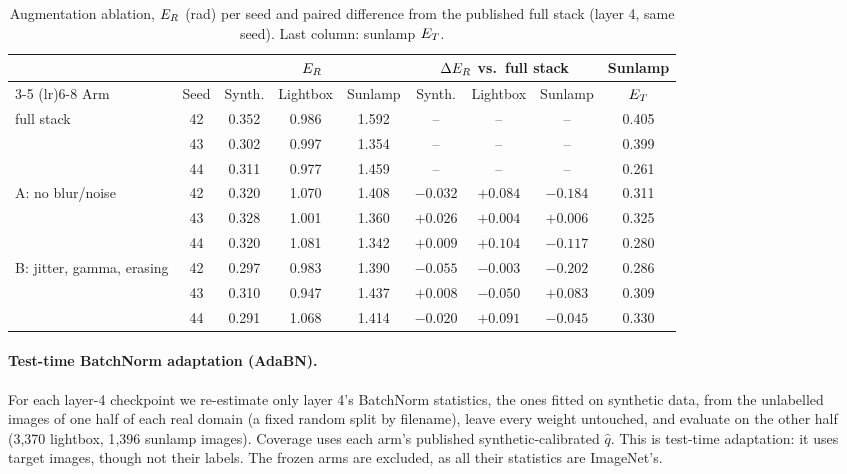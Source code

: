 \begin{table}[ht]
  \setlength{\tabcolsep}{3pt}
  \caption{Augmentation ablation, $E_{R}$ (rad) per seed and paired difference from
  the published full stack (layer 4, same seed). Last column: sunlamp $E_{T}$.}
  \label{tab:ablation}
  \centering
  \small
  \begin{tabular}{l c ccc ccc c}
    \toprule
    & & \multicolumn{3}{c}{$E_{R}$} & \multicolumn{3}{c}{$\Delta E_{R}$ vs.\ full stack} & Sunlamp \\
    \cmidrule(lr){3-5} \cmidrule(lr){6-8}
    Arm & Seed & Synth. & Lightbox & Sunlamp & Synth. & Lightbox & Sunlamp & $E_{T}$ \\
    \midrule
    full stack & 42 & 0.352 & 0.986 & 1.592 & -- & -- & -- & 0.405 \\
     & 43 & 0.302 & 0.997 & 1.354 & -- & -- & -- & 0.399 \\
     & 44 & 0.311 & 0.977 & 1.459 & -- & -- & -- & 0.261 \\
    \midrule
    A: no blur/noise & 42 & 0.320 & 1.070 & 1.408 & $-0.032$ & $+0.084$ & $-0.184$ & 0.311 \\
     & 43 & 0.328 & 1.001 & 1.360 & $+0.026$ & $+0.004$ & $+0.006$ & 0.325 \\
     & 44 & 0.320 & 1.081 & 1.342 & $+0.009$ & $+0.104$ & $-0.117$ & 0.280 \\
    \midrule
    B: jitter, gamma, erasing & 42 & 0.297 & 0.983 & 1.390 & $-0.055$ & $-0.003$ & $-0.202$ & 0.286 \\
     & 43 & 0.310 & 0.947 & 1.437 & $+0.008$ & $-0.050$ & $+0.083$ & 0.309 \\
     & 44 & 0.291 & 1.068 & 1.414 & $-0.020$ & $+0.091$ & $-0.045$ & 0.330 \\
    \bottomrule
  \end{tabular}
\end{table}

\paragraph{Test-time BatchNorm adaptation (AdaBN).} For each layer-4 checkpoint we
re-estimate only layer 4's BatchNorm statistics, the ones fitted on synthetic data, from
the unlabelled images of one half of each real domain (a fixed random split by
filename), leave every weight untouched, and evaluate on the other half (3{,}370 lightbox, 1{,}396 sunlamp
images). Coverage uses each arm's published synthetic-calibrated $\hat{q}$. This is
test-time adaptation: it uses target images, though not their labels. The frozen arms
are excluded, as all their statistics are ImageNet's.

